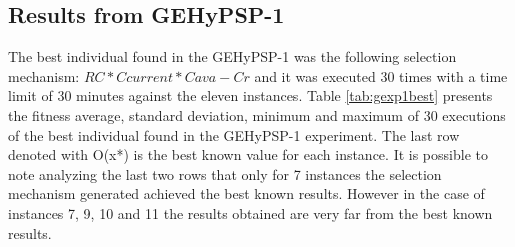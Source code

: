 \documentclass[conference]{IEEEtran}
\begin{document}





\subsection{Results from GEHyPSP-1}

The best individual found in the GEHyPSP-1 was the following selection mechanism:  $RC * Ccurrent * Cava - Cr$ and it was executed 30 times with a time limit of 30 minutes against the eleven instances. Table \ref{tab:gexp1best}  presents the fitness average, standard deviation, minimum and maximum of 30 executions of the best individual found in the GEHyPSP-1 experiment. The last row denoted with O(x*) is the best known value for each instance. It is possible to note analyzing the last two rows that only for 7 instances the selection mechanism generated achieved the best known  results. However in the case of instances 7, 9, 10 and 11 the results obtained are very far from the best known results.
\end{document}
